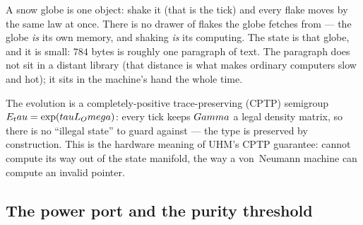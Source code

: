 \begin{zerobox}
A snow globe is one object: shake it (that is the tick) and every flake moves
by the same law at once. There is no drawer of flakes the globe fetches from
--- the globe \emph{is} its own memory, and shaking \emph{is} its computing.
The \TALOS{} state is that globe, and it is small: $784$ bytes is roughly one
paragraph of text. The paragraph does not sit in a distant library (that
distance is what makes ordinary computers slow and hot); it sits in the
machine's hand the whole time.
\end{zerobox}

The evolution is a completely-positive trace-preserving (CPTP) semigroup
$E_tau=\exp(tauL_Omega)$: every tick keeps $Gamma$ a legal
density matrix, so there is no ``illegal state'' to guard against --- the
type is preserved by construction. This is the hardware meaning of UHM's
CPTP guarantee: \TALOS{} cannot compute its way out of the state manifold,
the way a von~Neumann machine can compute an invalid pointer.

\subsection{The power port and the purity threshold}
\label{subsec:powerport}

